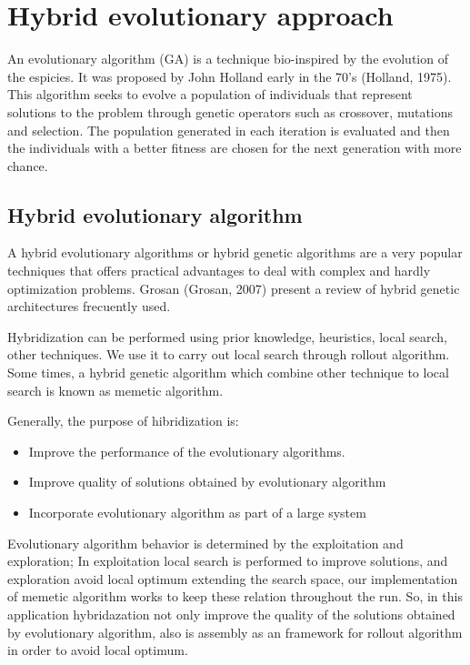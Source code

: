 \chapter{Hybrid evolutionary approach}
\label{chap:methodology}

An evolutionary algorithm (GA) is a technique bio-inspired by the evolution of the espicies. It was proposed by John Holland early in the 70's (Holland, 1975). This algorithm seeks to evolve a population of individuals that represent solutions to the problem through genetic operators such as crossover, mutations and selection. The population generated in each iteration is evaluated and then the individuals with a better fitness are chosen for the next generation with more chance.

\section{Hybrid evolutionary algorithm}

A hybrid evolutionary algorithms or hybrid genetic algorithms are a very popular techniques that offers practical advantages to deal with complex and hardly optimization problems. Grosan (Grosan, 2007) present a review of hybrid genetic architectures frecuently used. 

Hybridization can be performed using prior knowledge, heuristics, local search, other techniques. We use it to carry out local search through rollout algorithm. Some times, a hybrid genetic algorithm which combine other technique to local search is known as memetic algorithm.

Generally, the purpose of hibridization is:

\begin{itemize}
 \item Improve the performance of the evolutionary algorithms.
 \item Improve quality of solutions obtained by evolutionary algorithm
 \item Incorporate evolutionary algorithm as part of a large system
\end{itemize}

Evolutionary algorithm behavior is determined by the exploitation and exploration; In exploitation local search is performed to improve solutions, and exploration avoid local optimum extending the search space, our implementation of memetic algorithm works to keep these relation throughout the run. So, in this application hybridazation not only improve the quality of the solutions obtained by evolutionary algorithm, also is assembly as an framework for rollout algorithm in order to avoid local optimum.


